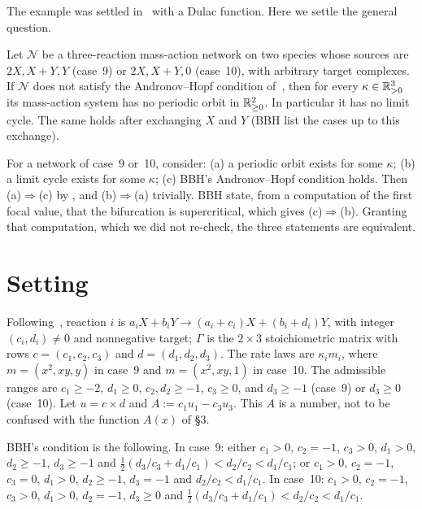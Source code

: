 \documentclass[11pt,a4paper]{report}
\begin{document}
The example was settled in~\autocite{Result2} with a Dulac function. Here we settle the general question.

\begin{theorem}\label{thm:A}
Let \(\mathcal N\) be a three-reaction mass-action network on two species whose sources are \(2X, X+Y, Y\) (case~9)
or \(2X, X+Y, 0\) (case~10), with arbitrary target complexes. If \(\mathcal N\) does not satisfy the Andronov--Hopf
condition of~\autocite[Theorem~9]{BBH2024}, then for every \(\kappa\in\mathbb{R}^3_{>0}\) its mass-action system has no
periodic orbit in \(\mathbb{R}^2_{\ge0}\). In particular it has no limit cycle. The same holds after exchanging \(X\) and
\(Y\) (BBH list the cases up to this exchange).
\end{theorem}

\begin{corollary}\label{cor:B}
For a network of case~9 or~10, consider: (a) a periodic orbit exists for some \(\kappa\); (b) a limit cycle exists
for some \(\kappa\); (c) BBH's Andronov--Hopf condition holds. Then (a)\(\Rightarrow\)(c) by , and
(b)\(\Rightarrow\)(a) trivially. BBH state, from a computation of the first focal value, that the bifurcation is
supercritical, which gives (c)\(\Rightarrow\)(b). Granting that computation, which we did not re-check, the three
statements are equivalent.
\end{corollary}

\section{Setting}

Following~\autocite[(13)--(18)]{BBH2024}, reaction \(i\) is \(a_iX+b_iY\to(a_i+c_i)X+(b_i+d_i)Y\), with integer
\((c_i,d_i)\neq0\) and nonnegative target; \(\Gamma\) is the \(2\times3\) stoichiometric matrix with rows
\(c=(c_1,c_2,c_3)\) and \(d=(d_1,d_2,d_3)\). The rate laws are \(\kappa_i m_i\), where
\(m=(x^2,xy,y)\) in case~9 and \(m=(x^2,xy,1)\) in case~10. The admissible ranges are \(c_1\ge-2\), \(d_1\ge0\),
\(c_2,d_2\ge-1\), \(c_3\ge0\), and \(d_3\ge-1\) (case~9) or \(d_3\ge0\) (case~10). Let \(u=c\times d\) and
\(A:=c_1u_1-c_3u_3\). This \(A\) is a number, not to be confused with the function \(A(x)\) of §3.

BBH's condition is the following. In case~9: either \(c_1>0\), \(c_2=-1\), \(c_3>0\), \(d_1>0\), \(d_2\ge-1\),
\(d_3\ge-1\) and \(\tfrac12(d_3/c_3+d_1/c_1)<d_2/c_2<d_1/c_1\); or \(c_1>0\), \(c_2=-1\), \(c_3=0\), \(d_1>0\),
\(d_2\ge-1\), \(d_3=-1\) and \(d_2/c_2<d_1/c_1\). In case~10: \(c_1>0\), \(c_2=-1\), \(c_3>0\), \(d_1>0\),
\(d_2=-1\), \(d_3\ge0\) and \(\tfrac12(d_3/c_3+d_1/c_1)<d_2/c_2<d_1/c_1\).
\end{document}

